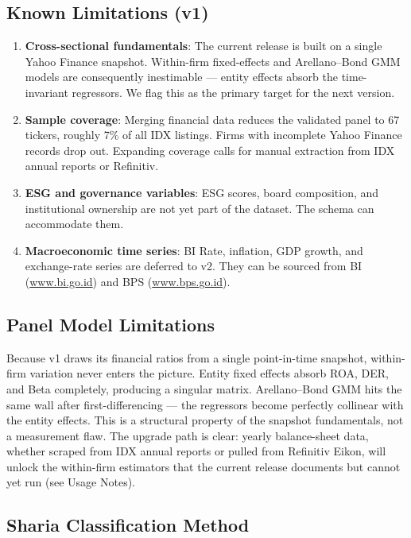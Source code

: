 \documentclass[11pt,a4paper]{article}
\begin{document}
\subsection{Known Limitations (v1)}

\begin{enumerate}[leftmargin=*,nosep]
\item \textbf{Cross-sectional fundamentals}: The current release is built on a single Yahoo Finance snapshot. Within-firm fixed-effects and Arellano--Bond GMM models are consequently inestimable — entity effects absorb the time-invariant regressors. We flag this as the primary target for the next version.
\item \textbf{Sample coverage}: Merging financial data reduces the validated panel to 67 tickers, roughly 7\% of all IDX listings. Firms with incomplete Yahoo Finance records drop out. Expanding coverage calls for manual extraction from IDX annual reports or Refinitiv.
\item \textbf{ESG and governance variables}: ESG scores, board composition, and institutional ownership are not yet part of the dataset. The schema can accommodate them.
\item \textbf{Macroeconomic time series}: BI Rate, inflation, GDP growth, and exchange-rate series are deferred to v2. They can be sourced from BI (\url{www.bi.go.id}) and BPS (\url{www.bps.go.id}).
\end{enumerate}

\subsection{Panel Model Limitations}

Because v1 draws its financial ratios from a single point-in-time snapshot, within-firm variation never enters the picture. Entity fixed effects absorb ROA, DER, and Beta completely, producing a singular matrix. Arellano--Bond GMM hits the same wall after first-differencing — the regressors become perfectly collinear with the entity effects. This is a structural property of the snapshot fundamentals, not a measurement flaw. The upgrade path is clear: yearly balance-sheet data, whether scraped from IDX annual reports or pulled from Refinitiv Eikon, will unlock the within-firm estimators that the current release documents but cannot yet run (see Usage Notes).

\subsection{Sharia Classification Method}
\end{document}
